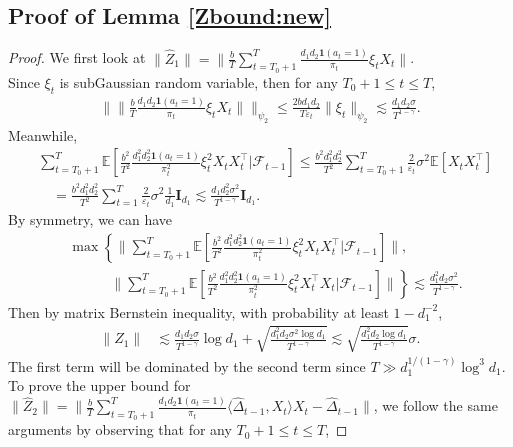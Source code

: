 \documentclass[12pt]{article}
\newcommand{\inp}[2]{\langle #1,#2\rangle}
\def\EE{{\mathbb E}}
\def\indicator{\mathbf{1}}
\theoremstyle{plain}
\begin{document}
\subsection{Proof of Lemma \ref{Zbound:new}}
\begin{proof}
    We first look at $\|\widehat{Z}_1\|=\|\frac{b}{T}\sum_{t=T_0+1}^{T}\frac{d_1d_2\indicator(a_t=1)}{\pi_t}\xi_tX_t\|$.\\
    Since $\xi_t$ is subGaussian random variable, then for any $T_0+1\leq t\leq T$,
    \begin{align*}
        \bigg\|\|\frac{b}{T}\frac{d_1d_2\indicator(a_t=1)}{\pi_t}\xi_tX_t\|\bigg\|_{\psi_2}\leq \frac{2bd_1d_2}{T\varepsilon_t}\|\xi_t\|_{\psi_2}\lesssim \frac{d_1d_2\sigma}{T^{1-\gamma}}.
    \end{align*}
    Meanwhile,
    \begin{align*}
        &\sum_{t=T_0+1}^{T} \EE\left[\frac{b^2}{T^2}\frac{d_1^2d_2^2\indicator(a_t=1)}{\pi_t^2}\xi_t^2X_tX_t^{\top}\bigg|\mathcal{F}_{t-1}\right]\leq \frac{b^2d_1^2d_2^2}{T^2}\sum_{t=T_0+1}^{T}\frac{2}{\varepsilon_t}\sigma^2\EE[X_tX_t^{\top}] \\
        &\quad = \frac{b^2d_1^2d_2^2}{T^2}\sum_{t=1}^{T}\frac{2}{\varepsilon_t}\sigma^2\frac{1}{d_1}\boldsymbol{I}_{d_1} \lesssim \frac{d_1d_2^2\sigma^2}{T^{1-\gamma}}\boldsymbol{I}_{d_1}.
    \end{align*}
    By symmetry, we can have
    \begin{align*}
        &\max\left\{\bigg\|\sum_{t=T_0+1}^{T} \EE\left[\frac{b^2}{T^2}\frac{d_1^2d_2^2\indicator(a_t=1)}{\pi_t^2}\xi_t^2X_tX_t^{\top}\bigg|\mathcal{F}_{t-1}\right]\bigg\|, \right.\\ & \left.\quad\quad\quad \bigg\|\sum_{t=T_0+1}^{T} \EE\left[\frac{b^2}{T^2}\frac{d_1^2d_2^2\indicator(a_t=1)}{\pi_t^2}\xi_t^2X_t^{\top}X_t\bigg|\mathcal{F}_{t-1}\right]\bigg\|\right\} \lesssim \frac{d_1^2d_2\sigma^2}{T^{1-\gamma}}.
    \end{align*}
    Then by matrix Bernstein inequality, with probability at least $1-d_1^{-2}$,
    \begin{align*}
        \|\widehat{Z}_1\|&\lesssim \frac{d_1d_2\sigma}{T^{1-\gamma}}\log d_1 + \sqrt{\frac{d_1^2d_2\sigma^2\log d_1}{T^{1-\gamma}}} \lesssim \sqrt{\frac{d_1^2d_2\log d_1}{T^{1-\gamma}}}\sigma.
    \end{align*}
    The first term will be dominated by the second term since $T\gg d_1^{1/(1-\gamma)}\log^3d_1$. \\
    To prove the upper bound for $\|\widehat{Z}_2\|=\|\frac{b}{T}\sum_{t=T_0+1}^{T}\frac{d_1d_2\indicator(a_t=1)}{\pi_t}\inp{\widehat{\Delta}_{t-1}}{X_t}X_t-\widehat{\Delta}_{t-1}\|$, we follow the same arguments by observing that for any $T_0+1\leq t\leq T$,

\end{proof}
\end{document}
